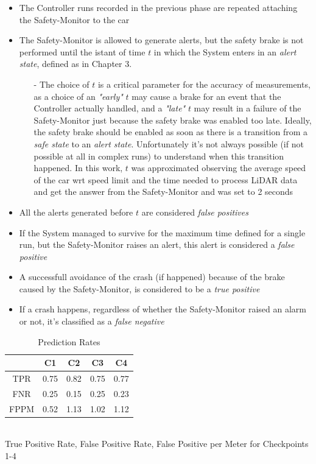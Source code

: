 \begin{itemize}
	\item The Controller runs recorded in the previous phase are repeated attaching the Safety-Monitor to the car
	\item The Safety-Monitor is allowed to generate alerts, but the safety brake is not performed until the istant of time $t$ in which the System enters in an \textsl{alert state}, defined as in Chapter 3.
	\begin{itemize}
		\item[-] The choice of $t$ is a critical parameter for the accuracy of measurements, as a choice of an \textsl{"early"} $t$ may cause a brake for an event that the Controller actually handled, and a \textsl{"late"} $t$ may result in a failure of the Safety-Monitor just because the safety brake was enabled too late. Ideally, the safety brake should be enabled as soon as there is a transition from a \textsl{safe state} to an \textsl{alert state}. Unfortunately it's not always possible (if not possible at all in complex runs) to understand when this transition happened. In this work, $t$ was approximated observing the average speed of the car wrt speed limit and the time needed to process LiDAR data and get the answer from the Safety-Monitor and was set to 2 seconds
	\end{itemize}
	\item All the alerts generated before $t$ are considered \textsl{false positives}
	\item If the System managed to survive for the maximum time defined for a single run, but the Safety-Monitor raises an alert, this alert is considered a \textsl{false positive}
	\item A successfull avoidance of the crash (if happened) because of the brake caused by the Safety-Monitor, is considered to be a \textsl{true positive}
	\item If a crash happens, regardless of whether the Safety-Monitor raised an alarm or not, it's classified as a \textsl{false negative}
\end{itemize}

\vspace{0.5cm}
\begin{table}[h]
	\caption{Prediction Rates}
	\begin{center}
		\begin{tabular}{ |c|c|c|c|c| }
			\hline
			  & C1 & C2 & C3 & C4 \\
			\hline
			TPR & 0.75 & 0.82 & 0.75 & 0.77 \\
			\hline
			FNR & 0.25 & 0.15 & 0.25 & 0.23 \\
			\hline
			FPPM & 0.52 & 1.13 & 1.02 & 1.12 \\
			\hline
			
		\end{tabular}
	\\
	\vspace{0.3cm}
	True Positive Rate, False Positive Rate, False Positive per Meter for Checkpoints 1-4
	\end{center}
\end{table}

